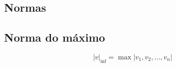 \subsection{Normas}

\subsection{Norma do máximo}

\begin{equation}
    |v|_{\inf} = \max |v_{1}, v_{2}, ..., v_{n} |
\end{equation}
